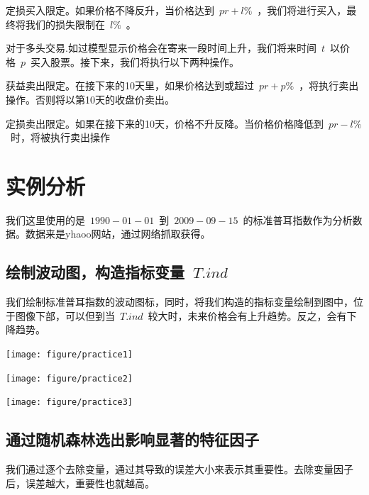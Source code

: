 \documentclass{article}\usepackage[]{graphicx}\usepackage[]{color}
\newenvironment{knitrout}{}{} %
\begin{document}
\begin{CJK*}{UTF8}{gkai}
\textbullet 定损买入限定。如果价格不降反升，当价格达到~$pr+l\%$~，我们将进行买入，最终将我们的损失限制在~$l\%$~。

对于多头交易.如过模型显示价格会在寄来一段时间上升，我们将来时间~$t$~以价格~$p$~买入股票。接下来，我们将执行以下两种操作。

\textbullet 获益卖出限定。在接下来的10天里，如果价格达到或超过~$pr+p\%$~，将执行卖出操作。否则将以第10天的收盘价卖出。

\textbullet 定损卖出限定。如果在接下来的10天，价格不升反降。当价格价格降低到~$pr-l\%$~时，将被执行卖出操作
\section{实例分析}
我们这里使用的是~$1990-01-01$~到~$2009-09-15$~的标准普耳指数作为分析数据。数据来是yhaoo网站，通过网络抓取获得。
\subsection{绘制波动图，构造指标变量~$T.ind$~}
我们绘制标准普耳指数的波动图标，同时，将我们构造的指标变量绘制到图中，位于图像下部，可以但到当~$T.ind$~较大时，未来价格会有上升趋势。反之，会有下降趋势。


\begin{knitrout}
\color{fgcolor}

{\centering \texttt{[image: figure/practice1]} 

}




{\centering \texttt{[image: figure/practice2]} 

}




{\centering \texttt{[image: figure/practice3]} 

}



\end{knitrout}

\subsection{通过随机森林选出影响显著的特征因子}



我们通过逐个去除变量，通过其导致的误差大小来表示其重要性。去除变量因子后，误差越大，重要性也就越高。
\begin{knitrout}
\color{fgcolor}


\end{knitrout}
\end{CJK*}
\end{document}

